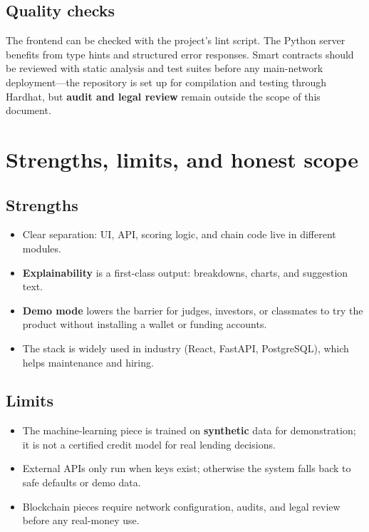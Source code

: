 \documentclass[11pt,a4paper]{article}
\begin{document}
\subsection{Quality checks}
The frontend can be checked with the project's lint script. The Python server benefits from type hints and structured error responses. Smart contracts should be reviewed with static analysis and test suites before any main-network deployment---the repository is set up for compilation and testing through Hardhat, but \textbf{audit and legal review} remain outside the scope of this document.

\section{Strengths, limits, and honest scope}
\subsection{Strengths}
\begin{itemize}[leftmargin=*]
  \item Clear separation: UI, API, scoring logic, and chain code live in different modules.
  \item \textbf{Explainability} is a first-class output: breakdowns, charts, and suggestion text.
  \item \textbf{Demo mode} lowers the barrier for judges, investors, or classmates to try the product without installing a wallet or funding accounts.
  \item The stack is widely used in industry (React, FastAPI, PostgreSQL), which helps maintenance and hiring.
\end{itemize}

\subsection{Limits}
\begin{itemize}[leftmargin=*]
  \item The machine-learning piece is trained on \textbf{synthetic} data for demonstration; it is not a certified credit model for real lending decisions.
  \item External APIs only run when keys exist; otherwise the system falls back to safe defaults or demo data.
  \item Blockchain pieces require network configuration, audits, and legal review before any real-money use.
\end{itemize}
\end{document}
